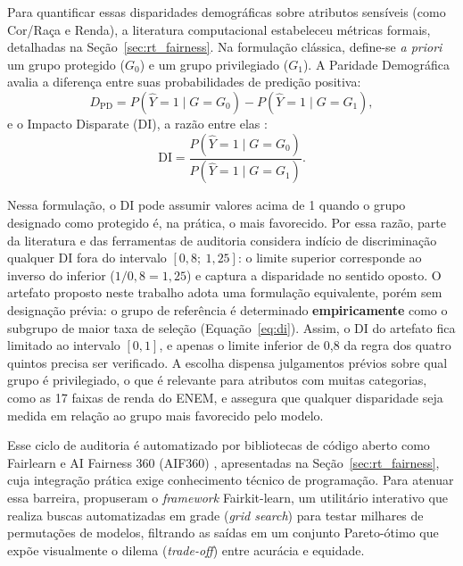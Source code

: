 Para quantificar essas disparidades demográficas sobre atributos sensíveis (como Cor/Raça e Renda), a literatura computacional estabeleceu métricas formais, detalhadas na Seção~\ref{sec:rt_fairness}. Na formulação clássica, define-se \textit{a priori} um grupo protegido ($G_0$) e um grupo privilegiado ($G_1$). A Paridade Demográfica avalia a diferença entre suas probabilidades de predição positiva:
\begin{equation*}
D_{\mathrm{PD}} = P(\hat{Y}=1 \mid G=G_0) - P(\hat{Y}=1 \mid G=G_1),
\end{equation*}
e o Impacto Disparate (DI), a razão entre elas \cite{feldman2015certifying}:
\begin{equation*}
\mathrm{DI} = \frac{P(\hat{Y}=1 \mid G=G_0)}{P(\hat{Y}=1 \mid G=G_1)}.
\end{equation*}

Nessa formulação, o DI pode assumir valores acima de 1 quando o grupo designado como protegido é, na prática, o mais favorecido. Por essa razão, parte da literatura e das ferramentas de auditoria considera indício de discriminação qualquer DI fora do intervalo $[0{,}8;\ 1{,}25]$: o limite superior corresponde ao inverso do inferior ($1/0{,}8 = 1{,}25$) e captura a disparidade no sentido oposto. O artefato proposto neste trabalho adota uma formulação equivalente, porém sem designação prévia: o grupo de referência é determinado \textbf{empiricamente} como o subgrupo de maior taxa de seleção (Equação~\eqref{eq:di}). Assim, o DI do artefato fica limitado ao intervalo $[0, 1]$, e apenas o limite inferior de 0,8 da regra dos quatro quintos \cite{eeoc1978uniform} precisa ser verificado. A escolha dispensa julgamentos prévios sobre qual grupo é privilegiado, o que é relevante para atributos com muitas categorias, como as 17 faixas de renda do ENEM, e assegura que qualquer disparidade seja medida em relação ao grupo mais favorecido pelo modelo.

Esse ciclo de auditoria é automatizado por bibliotecas de código aberto como Fairlearn \cite{bird2020fairlearn} e AI Fairness 360 (AIF360) \cite{bellamy2018aif360}, apresentadas na Seção~\ref{sec:rt_fairness}, cuja integração prática exige conhecimento técnico de programação. Para atenuar essa barreira,  propuseram o \textit{framework} Fairkit-learn, um utilitário interativo que realiza buscas automatizadas em grade (\textit{grid search}) para testar milhares de permutações de modelos, filtrando as saídas em um conjunto Pareto-ótimo que expõe visualmente o dilema (\textit{trade-off}) entre acurácia e equidade.

